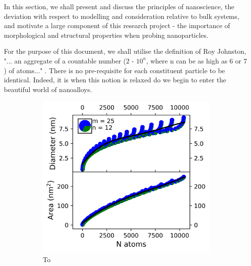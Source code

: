 In this section, we shall present and discuss the principles of nanoscience, the deviation with respect to modelling and consideration relative to bulk systems, and motivate a large component of this research project - the importance of morphological and structural properties when probing nanoparticles.

For the purpose of this document, we shall utilise the definition of Roy Johnston, "... an aggregate of a countable number ($2$ - $10^n$, where n can be as high as $6$ or $7$) of atoms..." \cite{johnston2002atomic}. There is no pre-requisite for each constituent particle to be identical. Indeed, it is when this notion is relaxed do we begin to enter the beautiful world of nanoalloys.


\begin{figure}
\centering
\begin{subfigure}[b]{0.425\textwidth}
    \includegraphics[width=\textwidth]{figures/Theory/To_Size_lin.png}
    \caption{To} 
    \label{Fig:Nps_To}
\end{subfigure}
\begin{subfigure}[b]{0.425\textwidth}

\end{subfigure}
\end{figure}
